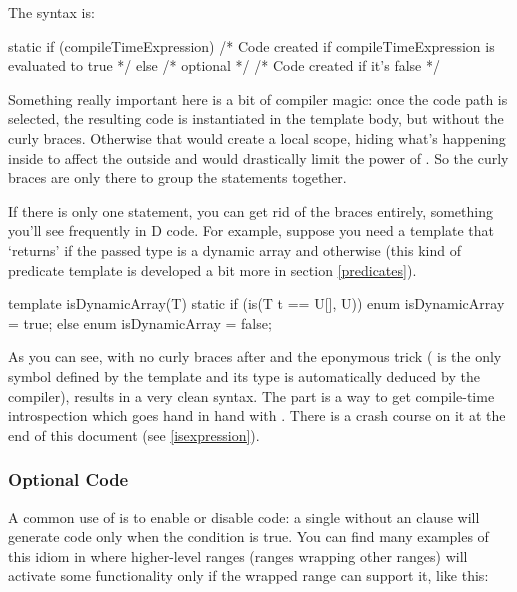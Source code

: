 The syntax is:
\begin{dcode}
static if (compileTimeExpression)
{
     /* Code created if compileTimeExpression is evaluated to true */
}
else /* optional */
{
     /* Code created if it's false */
}
\end{dcode}

Something really important here is a bit of compiler magic: once the code path is selected, the resulting code is instantiated in the template body, but without the curly braces. Otherwise that would create a local scope, hiding what's happening inside to affect the outside and would drastically limit the power of . So the curly braces are only there to group the statements together. 

If there is only one statement, you can get rid of the braces entirely, something you'll see frequently in D code. For example, suppose you need a template that `returns'  if the passed type is a dynamic array and  otherwise (this kind of predicate template is developed a bit more in section \ref{predicates}).

\begin{dcode}
template isDynamicArray(T)
{
    static if (is(T t == U[], U))
        enum isDynamicArray = true;
    else
        enum isDynamicArray = false;
}
\end{dcode}

As you can see, with no curly braces after  and the eponymous trick ( is the only symbol defined by the template and its type is automatically deduced by the compiler), results in a very clean syntax. The \DD{()} part is a way to get compile-time introspection which goes hand in hand with . There is a crash course on it at the end of this document (see \autoref{isexpression}).

\subsubsection{Optional Code}

A common use of  is to enable or disable code: a single  without an  clause will generate code only when the condition is true. You can find many examples of this idiom in  where higher-level ranges (ranges wrapping other ranges) will activate some functionality only if the wrapped range can support it, like this:


